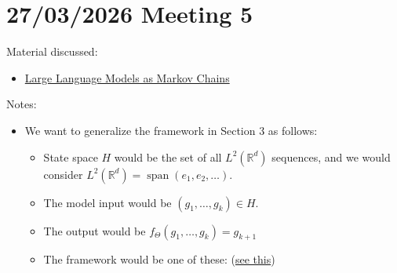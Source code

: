 \documentclass{article}
\begin{document}
\section{27/03/2026 Meeting 5}
Material discussed:
\begin{itemize}
    \item \href{https://arxiv.org/abs/2410.02724}{Large Language Models as Markov Chains}
\end{itemize}
Notes:
\begin{itemize}
    \item We want to generalize the framework in Section 3 as follows:
    \begin{itemize}
        \item State space $H$ would be the set of all $L^2(\mathbb R^d)$ sequences, and we would consider $L^2(\mathbb R^d) = \operatorname{span}(e_1,e_2,\ldots)$.
        \item The model input would be $(g_1,\ldots,g_k) \in H$.
        \item The output would be $f_\Theta(g_1,\ldots,g_k) = g_{k+1}$
        \item The framework would be one of these: (\href{https://en.wikipedia.org/wiki/Markov_chains_on_a_measurable_state_space}{see this})
        

\end{itemize}
\end{itemize}
\end{document}
